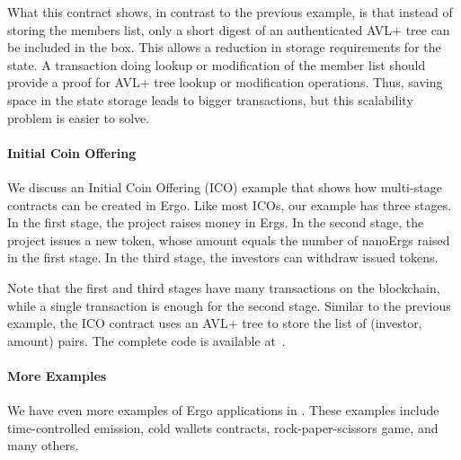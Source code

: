  What this contract shows, in contrast to the previous example, is that instead of storing the members list, only a short digest of an authenticated AVL+ tree can be included in the box. This allows a reduction in storage requirements for the state. A transaction doing lookup or modification of the member list should provide a proof for AVL+ tree lookup or modification operations. Thus, saving space in the state storage leads to bigger transactions, but this scalability problem is easier to solve.

\paragraph{Initial Coin Offering}

 We discuss an Initial Coin Offering (ICO) example that shows how multi-stage contracts can be created in Ergo. Like most ICOs, our example has three stages. In the first stage, the project raises money in Ergs. In the second stage, the project issues a new token, whose amount equals the number of nanoErgs raised in the first stage. In the third stage, the investors can withdraw issued tokens.

 Note that the first and third stages have many transactions on
 the blockchain, while a single transaction is enough for the second stage. Similar to the previous example, the ICO contract uses an AVL+ tree to store the list of (investor, amount) pairs. The complete code is available at~\cite{icoTutorial}.


\paragraph{More Examples}

 We have even more examples of Ergo applications in \cite{ergoTutorial, ergoAdvTutorial}. These examples include time-controlled emission, cold wallets contracts, rock-paper-scissors game, and many others.
